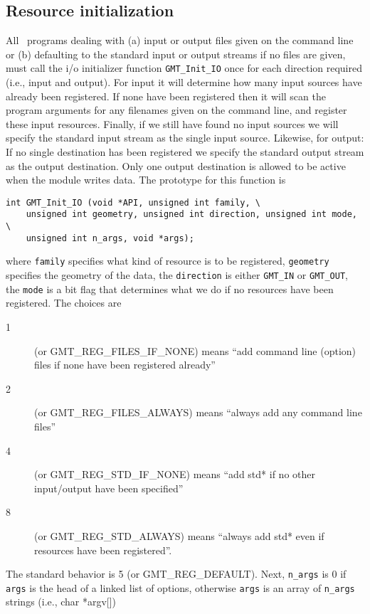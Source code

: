 \documentclass[11pt]{report}
\begin{document}
\subsection{Resource initialization}
All \GMT\ programs dealing with (a) input or output files given on the command line or (b) defaulting to
the standard input or output streams if no files are given, must call the i/o initializer function
\texttt{GMT\_Init\_IO} once for each direction required (i.e., input and output).
For input it will determine how many input sources have already been registered.
If none have been registered then it will scan the program arguments for any filenames given on the command line, and register
these input resources.  Finally, if we still have found no input sources we will specify the standard input stream
as the single input source.  Likewise, for output: If no single destination has been registered we specify the standard output stream
as the output destination.  Only one output destination is allowed to be active when the module writes data.
The prototype for this function is

\begin{verbatim}
int GMT_Init_IO (void *API, unsigned int family, \
    unsigned int geometry, unsigned int direction, unsigned int mode, \
    unsigned int n_args, void *args);
\end{verbatim}
where \texttt{family} specifies what kind of resource is to be registered,
\texttt{geometry} specifies the geometry of the data,
the \texttt{direction} is either \texttt{GMT\_IN} or \texttt{GMT\_OUT}, the
\texttt{mode} is a bit flag that determines what we do if no resources have been
registered. The choices are
\begin{description}
	\item [1] (or GMT\_REG\_FILES\_IF\_NONE) means ``add command line (option) files if none have been registered already''
	\item [2] (or GMT\_REG\_FILES\_ALWAYS) means ``always add any command line files''
	\item [4] (or GMT\_REG\_STD\_IF\_NONE) means ``add std* if no other input/output have been specified''
	\item [8] (or GMT\_REG\_STD\_ALWAYS) means ``always add std* even if resources have been registered''.
\end{description}
The standard behavior is 5 (or GMT\_REG\_DEFAULT).
Next, \texttt{n\_args} is 0 if \texttt{args} is the head of a linked list of options, otherwise \texttt{args} is an array of \texttt{n\_args} strings (i.e., char *argv[])
\end{document}
